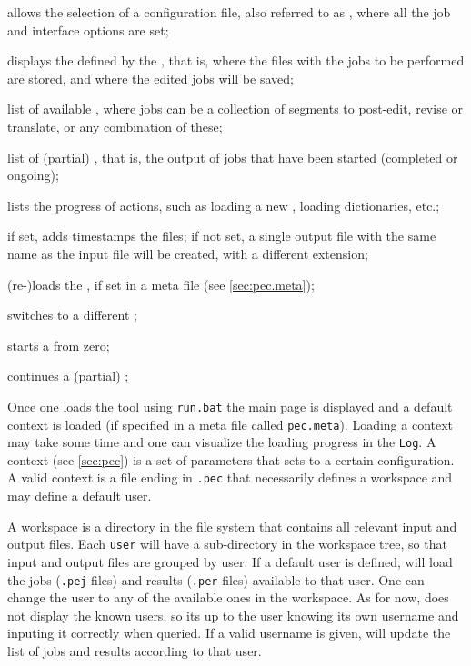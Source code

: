 \begin{description}
	\setlength\itemindent{0.5cm}  
	\item[\tt Configuration] allows the selection of a configuration file, also referred to as , where all the job and interface options are set;
	\item[\tt Workspace] displays the  defined by the , that is, where the files with the jobs to be performed are stored, and where the edited jobs will be saved;
	\item[\tt Jobs] list of available , where jobs can be a collection of segments to post-edit, revise or translate, or any combination of these;
	\item[\tt Results] list of (partial) , that is, the output of jobs that have been started (completed or ongoing);
	\item[\tt Log] lists the progress of actions, such as loading a new , loading dictionaries, etc.;
	\item[\tt Output timestamp] if set, adds timestamps the  files; if not set, a single output file with the same name as the input file will be created, with a different extension;
	\item[\tt Default] (re-)loads the , if set in a meta file (see \ref{sec:pec.meta});
	\item[\tt User] switches to a different ;
	\item[\tt Start] starts a  from zero;
	\item[\tt Edit] continues a (partial) ;
\end{description}

Once one loads the tool using {\tt run.bat} the main page is displayed and a default context is loaded (if specified in a meta file called {\tt pec.meta}).
Loading a context may take some time and one can visualize the loading progress in the {\tt Log}.
A context (see \ref{sec:pec}) is a set of parameters that sets \PET to a certain configuration. A valid context is a file ending in {\tt .pec} that necessarily defines a workspace and may define a default user.

A workspace is a directory in the file system that contains all relevant input and output files.
Each {\tt user} will have a sub-directory in the workspace tree, so that input and output files are grouped by user.
If a default user is defined, \PET will load the jobs ({\tt .pej} files) and results ({\tt .per} files) available to that user.
One can change the user to any of the available ones in the workspace. As for now, \PET does not display the known users, so its up to the user knowing its own username and inputing it correctly when queried.
If a valid username is given, \PET will update the list of jobs and results according to that user.

